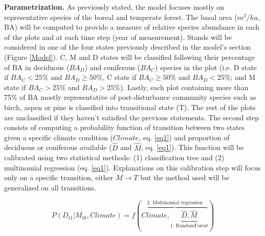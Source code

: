 \textbf{Parametrization.} As previously stated, the model focuses mostly on
representative species of the boreal and temperate forest. The basal area
($m^2/ha$, BA) will be computed to provide a measure of relative species
abundance in each of the plots and at each time step (year of measurement).
Stands will be considered in one of the four states previously described in
the model's section (Figure \ref{Model}). C, M and D states will be classified
following their percentage of BA in deciduous ($BA_D$) and coniferous ($BA_C$)
species in the plot (i.e. D state if $BA_C < 25\%$ and $BA_D \geq 50\%$, C
state if ${BA}_C \geq 50\%$ and $BA_D < 25\%$; and M state if $BA_C > 25\%$
and $BA_D > 25\%$). Lastly, each plot containing more than 75\% of BA mostly
representative of post-disturbance community species such as birch, aspen or
pine is classified into transitional state (T). The rest of the plots are
unclassified if they haven't satisfied the previous statements. The second
step consists of computing a probability function of transition between two
states given a specific climate condition ($Climate$, eq. \ref{eq1}) and
proportion of deciduous or coniferous available ($\hat{D}$ and $\hat{M}$, eq.
\ref{eq1}). This function will be calibrated using two statistical methods:
(1) classification tree and (2) multinomial regression (eq. \ref{eq1}).
Explanations on this calibration step will focus only on a specific
transition, either $M \rightarrow T$ but the method used will be generalized
on all transitions.

\begin{equation}
P(D_{t1}|M_{t0}, Climate) = f(\overbrace{Climate, \underbrace{\hat{D}, \hat{M}}_\text{1. RandomForest}}^\text{2. Multinomial regression})
\label{eq1}
\end{equation}


